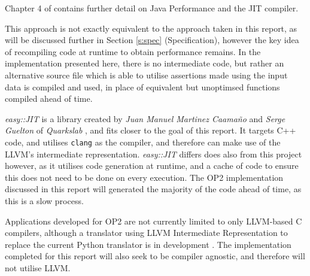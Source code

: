 \noindent Chapter 4 of \cite{javaPerf} contains further detail on Java Performance and the JIT compiler.

This approach is not exactly equivalent to the approach taken in this report, as will be discussed further in Section \ref{s:spec} (Specification), however the key idea of recompiling code at runtime to obtain performance remains. In the implementation presented here, there is no intermediate code, but rather an alternative source file which is able to utilise assertions made using the input data is compiled and used, in place of equivalent but unoptimsed functions compiled ahead of time.

\textit{easy::JIT} \cite{eJIT} is a library created by \textit{Juan Manuel Martinez Caamaño} and \textit{Serge Guelton} of \textit{Quarkslab} \cite{Quarkslab}, and fits closer to the goal of this report. It targets C++ code, and utilises \verb|clang| \cite{clang} as the compiler, and therefore can make use of the LLVM's intermediate representation. \textit{easy::JIT} differs does also from this project however, as it utilises code generation at runtime, and a cache of code to ensure this does not need to be done on every execution. The OP2 implementation discussed in this report will generated the majority of the code ahead of time, as this is a slow process.
\par
Applications developed for OP2 are not currently limited to only LLVM-based C compilers, although a translator using LLVM Intermediate Representation to replace the current Python translator is in development \cite{op2clang}. The implementation completed for this report will also seek to be compiler agnostic, and therefore will not utilise LLVM.
